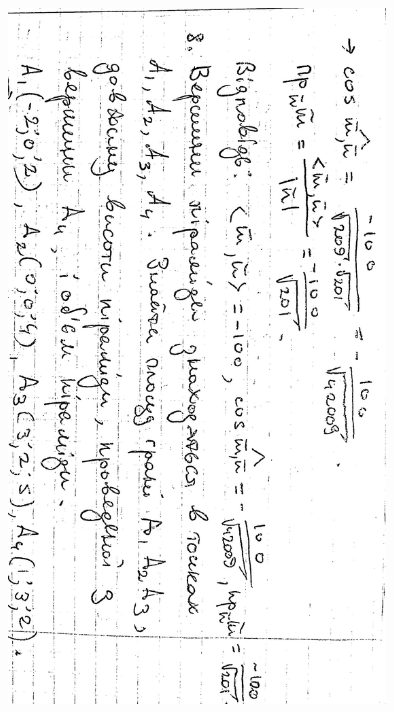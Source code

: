 \documentclass{article}
\begin{document}
\includegraphics[width=10cm,angle=90]{ons/11.jpg}\\
\end{document}
